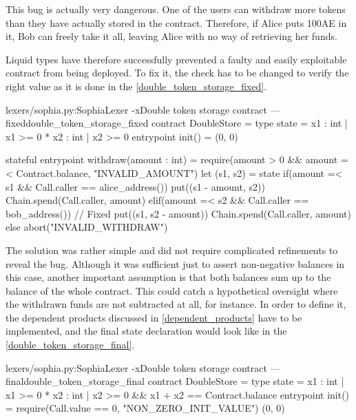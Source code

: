 This bug is actually very dangerous. One of the users can withdraw more tokens
than they have actually stored in the contract. Therefore, if Alice puts 100AE
in it, Bob can freely take it all, leaving Alice with no way of retrieving her
funds.

Liquid types have therefore successfully prevented a faulty and easily
exploitable contract from being deployed. To fix it, the check has to be changed
to verify the right value as it is done in the
\autoref{double_token_storage_fixed}.

\begin{code}[H]{lexers/sophia.py:SophiaLexer -x}{Double token storage contract ---
    fixed}{double_token_storage_fixed}
contract DoubleStore =
  type state = {x1 : int | x1 >= 0} * {x2 : int | x2 >= 0}
  entrypoint init() = (0, 0)

  stateful entrypoint withdraw(amount : int) =
    require(amount > 0 && amount =< Contract.balance, "INVALID_AMOUNT")
    let (s1, s2) = state
    if(amount =< s1 && Call.caller == alice_address())
      put((s1 - amount, s2))
      Chain.spend(Call.caller, amount)
    elif(amount =< s2 && Call.caller == bob_address()) // Fixed
      put((s1, s2 - amount))
      Chain.spend(Call.caller, amount)
    else
      abort("INVALID_WITHDRAW")
\end{code}

The solution was rather simple and did not require complicated refinements to
reveal the bug. Although it was sufficient just to assert non-negative balances
in this case, another important assumption is that both balances sum up to the
balance of the whole contract. This could catch a hypothetical oversight where
the withdrawn funds are not subtracted at all, for instance. In order to define
it, the dependent products discussed in \autoref{dependent_products} have to be
implemented, and the final state declaration would look like in the
\autoref{double_token_storage_final}.


\begin{code}[H]{lexers/sophia.py:SophiaLexer -x}{Double token storage contract ---
    final}{double_token_storage_final}
contract DoubleStore =
  type state = {x1 : int | x1 >= 0} *
               {x2 : int | x2 >= 0 && x1 + x2 == Contract.balance}
  entrypoint init() =
    require(Call.value == 0, "NON_ZERO_INIT_VALUE")
    (0, 0)
\end{code}
